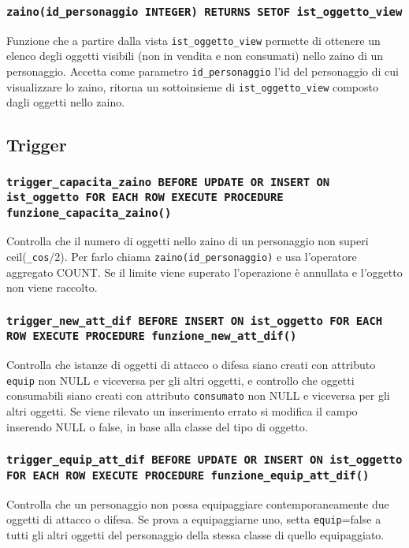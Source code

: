 \documentclass[10pt,a4paper]{article}
\begin{document}
\subsubsection{\texttt{zaino(id\_personaggio INTEGER) RETURNS SETOF ist\_oggetto\_view}}
Funzione che a partire dalla vista \texttt{ist\_oggetto\_view} permette di ottenere un elenco degli oggetti visibili (non in vendita e non consumati) nello zaino di un personaggio. Accetta come parametro \texttt{id\_personaggio} l'id del personaggio di cui visualizzare lo zaino, ritorna un sottoinsieme di \texttt{ist\_oggetto\_view} composto dagli oggetti nello zaino.

\subsection{Trigger}
\subsubsection{\texttt{trigger\_capacita\_zaino BEFORE UPDATE OR INSERT ON ist\_oggetto FOR EACH ROW EXECUTE PROCEDURE funzione\_capacita\_zaino()}}
Controlla che il numero di oggetti nello zaino di un personaggio non superi ceil(\texttt{\_cos}/2). Per farlo chiama \texttt{zaino(id\_personaggio)} e usa l'operatore aggregato COUNT. Se il limite viene superato l'operazione è annullata e l'oggetto non viene raccolto.

\subsubsection{\texttt{trigger\_new\_att\_dif BEFORE INSERT ON ist\_oggetto FOR EACH ROW EXECUTE PROCEDURE funzione\_new\_att\_dif()}}
Controlla che istanze di oggetti di attacco o difesa siano creati con attributo \texttt{equip} non NULL e viceversa per gli altri oggetti, e controllo che oggetti consumabili siano creati con attributo \texttt{consumato} non NULL e viceversa per gli altri oggetti. Se viene rilevato un inserimento errato si modifica il campo inserendo NULL o false, in base alla classe del tipo di oggetto.

\subsubsection{\texttt{trigger\_equip\_att\_dif BEFORE UPDATE OR INSERT ON ist\_oggetto FOR EACH ROW EXECUTE PROCEDURE funzione\_equip\_att\_dif()}}
Controlla che un personaggio non possa equipaggiare contemporaneamente due oggetti di attacco o difesa. Se prova a equipaggiarne uno, setta \texttt{equip}=false a tutti gli altri oggetti del personaggio della stessa classe di quello equipaggiato.
\end{document}

